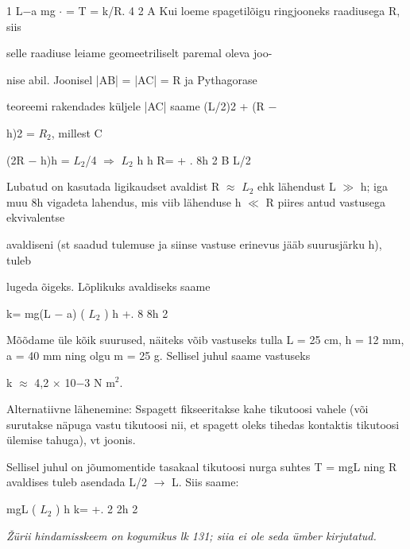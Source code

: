 1 L$-$a mg $\cdot$ = T = k/R. 4 2 A Kui loeme spagetilõigu ringjooneks raadiusega R, siis

selle raadiuse leiame geomeetriliselt paremal oleva joo-

nise abil. Joonisel |AB| = |AC| = R ja Pythagorase

teoreemi rakendades küljele |AC| saame (L/2)2 + (R $-$

h)2 = $R_2$, millest C

(2R $-$ h)h = $L_2$/4 $\Rightarrow$ $L_2$ h h R= + . 8h 2 B L/2

Lubatud on kasutada ligikaudset avaldist R $\approx$ $L_2$ ehk lähendust L $\gg$ h; iga muu 8h vigadeta lahendus, mis viib lähenduse h $\ll$ R piires antud vastusega ekvivalentse

avaldiseni (st saadud tulemuse ja siinse vastuse erinevus jääb suurusjärku h), tuleb

lugeda õigeks. Lõplikuks avaldiseks saame

k= mg(L $-$ a) ( $L_2$ ) h +. 8 8h 2

Mõõdame üle kõik suurused, näiteks võib vastuseks tulla L = 25 cm, h = 12 mm, a = 40 mm ning olgu m = 25 g. Sellisel juhul saame vastuseks

k $\approx$ 4,2 $\times$ 10$-$3 N m$^2$.

Alternatiivne lähenemine: Sspagett fikseeritakse kahe tikutoosi vahele (või surutakse näpuga vastu tikutoosi nii, et spagett oleks tihedas kontaktis tikutoosi ülemise tahuga), vt joonis.

Sellisel juhul on jõumomentide tasakaal tikutoosi nurga suhtes T = mgL ning R avaldises tuleb asendada L/2 $\rightarrow$ L. Siis saame:

mgL ( $L_2$ ) h k= +. 2 2h 2

\textit{Žürii hindamisskeem on kogumikus lk 131; siia ei ole seda ümber kirjutatud.}
\probend
